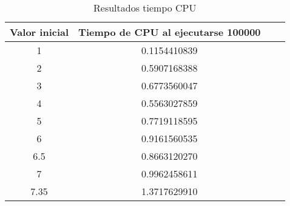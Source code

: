 \begin{table}[!h]
\begin{center}

\begin{tabular}{cccc}

Valor inicial & Tiempo de CPU al ejecutarse 100000\\

\hline
 
1 & 0.1154410839 \\
2 & 0.5907168388 \\
3 & 0.6773560047 \\
4 & 0.5563027859 \\
5 & 0.7719118595 \\
6 & 0.9161560535 \\
6.5 & 0.8663120270 \\
7 & 0.9962458611 \\
7.35 & 1.3717629910\\ 


\end{tabular}
\end{center}
\caption{Resultados tiempo CPU}
\label{tab:1}
\end{table} 